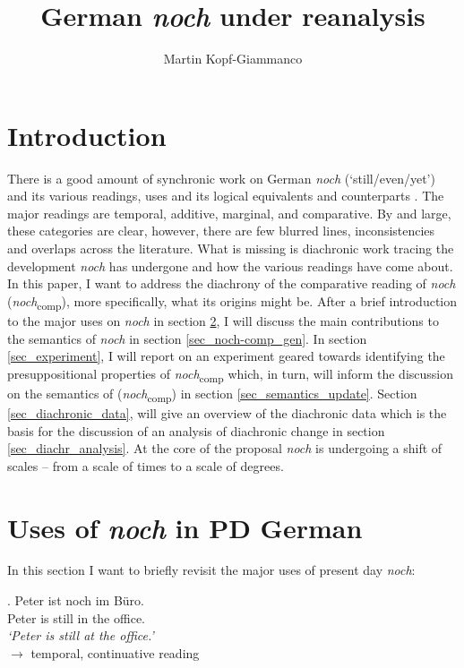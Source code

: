 \documentclass[output=paper,
modfonts
]{langscibook}
\title{German \textit{noch} under reanalysis}
\author{%
 Martin Kopf-Giammanco\affiliation{Universität des Saarlandes}
}
\begin{document}
\maketitle

\section{Introduction}\label{sec_intro}
There is a good amount of synchronic work on German \textit{noch} (`still/even/yet') and its various readings, uses and its logical equivalents and counterparts \citep[e.g.][]{koenig1977,loebner1989,Ippolito2007,umbach2009a_comp,umbach2009b_add,umbach2012,beck2016a_sub,beck2016b_disc}. The major readings are temporal, additive, marginal, and comparative. By and large, these categories are clear, however, there are few blurred lines, inconsistencies and overlaps across the literature. What is missing is diachronic work tracing the development \textit{noch} has undergone and how the various readings have come about. In this paper, I want to address the diachrony of the comparative reading of \textit{noch} (\textit{noch}\textsubscript{comp}), more specifically, what its origins might be. After a brief introduction to the major uses on \textit{noch} in section \ref{sec_major_readings}, I will discuss the main contributions to the semantics of \textit{noch} in section \ref{sec_noch-comp_gen}. In section \ref{sec_experiment}, I will report on an experiment geared towards identifying the presuppositional properties of \textit{noch}\textsubscript{comp} which, in turn, will inform the discussion on the semantics of (\textit{noch}\textsubscript{comp}) in section \ref{sec_semantics_update}. Section \ref{sec_diachronic_data}, will give an overview of the diachronic data which is the basis for the discussion of an analysis of diachronic change in section \ref{sec_diachr_analysis}. At the core of the proposal \textit{noch} is undergoing a shift of scales -- from a scale of times to a scale of degrees. 

\section{Uses of \textit{noch} in PD German} \label{sec_major_readings}

In this section I want to briefly revisit the major uses of present day \textit{noch}:

\exg. Peter ist noch im Büro.\\
Peter is still {in the} office.\\
\textit{`Peter is still at the office.'}\\ \hfill $\rightarrow$ temporal, continuative reading \label{NOCH_TEMP_cont_EXP}
\end{document}
